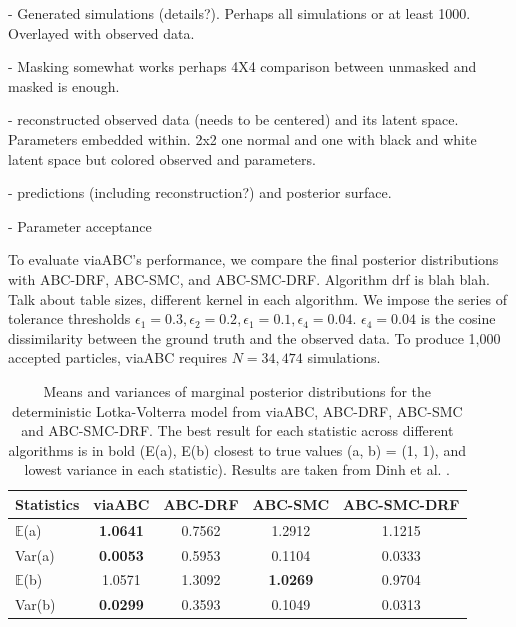 \documentclass[12pt]{article} %
\begin{document}
- Generated simulations (details?). Perhaps all simulations or at least 1000. Overlayed with observed data.

- Masking somewhat works perhaps 4X4 comparison between unmasked and masked is enough.

- reconstructed observed data (needs to be centered) and its latent space. Parameters embedded within. 2x2 one normal and one with black and white latent space but colored observed and parameters.

- predictions (including reconstruction?) and posterior surface.

- Parameter acceptance 

To evaluate viaABC's performance, we compare the final posterior distributions with ABC-DRF, ABC-SMC, and ABC-SMC-DRF. Algorithm drf is blah blah. Talk about table sizes, different kernel in each algorithm. 
We impose the series of tolerance thresholds $\epsilon_1 = 0.3, \epsilon_2 = 0.2, \epsilon_1 = 0.1, \epsilon_4 = 0.04$. $\epsilon_4 = 0.04$ is the cosine dissimilarity between the ground truth and the observed data. To produce 1,000 accepted particles, viaABC requires $N = 34,474$ simulations.

%

\begin{table}[htbp]
\centering
\begin{tabular}{l cccc}
\toprule
Statistics & viaABC & ABC-DRF & ABC-SMC & ABC-SMC-DRF \\
\midrule
$\mathbb{E}$(a) &\textbf{1.0641} & 0.7562 & 1.2912 & 1.1215 \\
Var(a) & \textbf{0.0053} & 0.5953 & 0.1104 & 0.0333 \\
$\mathbb{E}$(b) & 1.0571 & 1.3092 & \textbf{1.0269} & 0.9704 \\
Var(b) & \textbf{0.0299} & 0.3593 & 0.1049 & 0.0313 \\
\bottomrule
\end{tabular}
\caption{Means and variances of marginal posterior distributions for the deterministic Lotka-Volterra model from viaABC, ABC-DRF, ABC-SMC and ABC-SMC-DRF. The best result for each statistic across different algorithms is in bold (E(a), E(b) closest to true values (a, b) = (1, 1), and lowest variance in each statistic). Results are taken from Dinh et al. \citep{dinh2024approximate}.}
\label{tab:lotka_volterra_results} %
\end{table}
\end{document}
